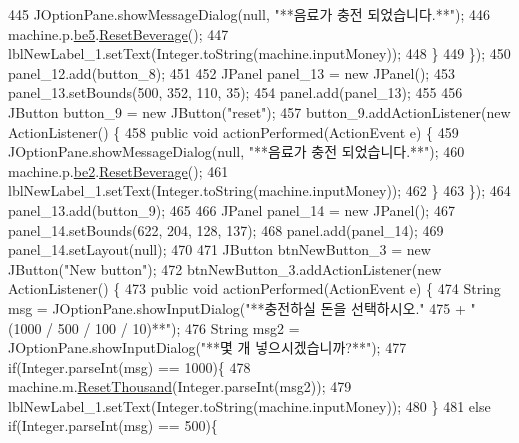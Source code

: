 \begin{DoxyCode}
445                 JOptionPane.showMessageDialog(null, \textcolor{stringliteral}{"**음료가 충전 되었습니다.**"});
446                 machine.p.\hyperlink{classsehw1_1_1product_a3818d4dbbdcf52983e2638206c51cc59}{be5}.\hyperlink{classsehw1_1_1beverage_a6082e0786cc6b8d805856372e768575e}{ResetBeverage}();
447                 lblNewLabel\_1.setText(Integer.toString(machine.inputMoney));
448             \}
449         \});
450         panel\_12.add(button\_8);
451         
452         JPanel panel\_13 = \textcolor{keyword}{new} JPanel();
453         panel\_13.setBounds(500, 352, 110, 35);
454         panel.add(panel\_13);
455         
456         JButton button\_9 = \textcolor{keyword}{new} JButton(\textcolor{stringliteral}{"reset"});
457         button\_9.addActionListener(\textcolor{keyword}{new} ActionListener() \{
458             \textcolor{keyword}{public} \textcolor{keywordtype}{void} actionPerformed(ActionEvent e) \{
459                 JOptionPane.showMessageDialog(null, \textcolor{stringliteral}{"**음료가 충전 되었습니다.**"});
460                 machine.p.\hyperlink{classsehw1_1_1product_a970d42cefd2a8aba360fbc62e1dfcd6f}{be2}.\hyperlink{classsehw1_1_1beverage_a6082e0786cc6b8d805856372e768575e}{ResetBeverage}();
461                 lblNewLabel\_1.setText(Integer.toString(machine.inputMoney));
462             \}
463         \});
464         panel\_13.add(button\_9);
465         
466         JPanel panel\_14 = \textcolor{keyword}{new} JPanel();
467         panel\_14.setBounds(622, 204, 128, 137);
468         panel.add(panel\_14);
469         panel\_14.setLayout(null);
470         
471         JButton btnNewButton\_3 = \textcolor{keyword}{new} JButton(\textcolor{stringliteral}{"New button"});
472         btnNewButton\_3.addActionListener(\textcolor{keyword}{new} ActionListener() \{
473             \textcolor{keyword}{public} \textcolor{keywordtype}{void} actionPerformed(ActionEvent e) \{
474                 String msg = JOptionPane.showInputDialog(\textcolor{stringliteral}{"**충전하실 돈을 선택하시오."}
475                         + \textcolor{stringliteral}{" (1000 / 500 / 100 / 10)**"});
476                 String msg2 = JOptionPane.showInputDialog(\textcolor{stringliteral}{"**몇 개 넣으시겠습니까?**"});
477                 \textcolor{keywordflow}{if}(Integer.parseInt(msg) == 1000)\{
478                     machine.m.\hyperlink{classsehw1_1_1money_a0e893d4a1c5209672a752ecb3e7285d6}{ResetThousand}(Integer.parseInt(msg2));
479                     lblNewLabel\_1.setText(Integer.toString(machine.inputMoney));
480                 \}
481                 \textcolor{keywordflow}{else} \textcolor{keywordflow}{if}(Integer.parseInt(msg) == 500)\{

\end{DoxyCode}
